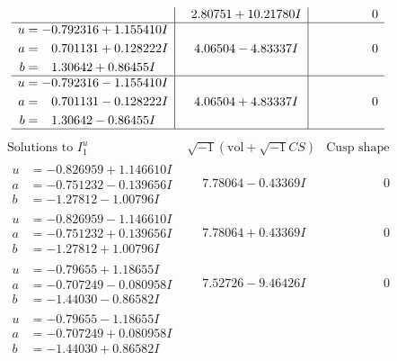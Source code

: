 \documentclass[1p]{elsarticle_modified}
\theoremstyle{definition}
\newcommand{\I}{\sqrt{-1}}
\begin{document}
$$\begin{array}{c|c|c}
 & \phantom{-}2.80751 + 10.21780 I & \phantom{-0.000000 } 0 \\ \hline\begin{aligned}
u &= -0.792316 + 1.155410 I \\
a &= \phantom{-}0.701131 + 0.128222 I \\
b &= \phantom{-}1.30642 + 0.86455 I\end{aligned}
 & \phantom{-}4.06504 - 4.83337 I & \phantom{-0.000000 } 0 \\ \hline\begin{aligned}
u &= -0.792316 - 1.155410 I \\
a &= \phantom{-}0.701131 - 0.128222 I \\
b &= \phantom{-}1.30642 - 0.86455 I\end{aligned}
 & \phantom{-}4.06504 + 4.83337 I & \phantom{-0.000000 } 0\\
 \hline 
 \end{array}$$\newpage$$\begin{array}{c|c|c}  
\text{Solutions to }I^u_{1}& \I (\text{vol} + \sqrt{-1}CS) & \text{Cusp shape}\\
 \hline 
\begin{aligned}
u &= -0.826959 + 1.146610 I \\
a &= -0.751232 - 0.139656 I \\
b &= -1.27812 - 1.00796 I\end{aligned}
 & \phantom{-}7.78064 - 0.43369 I & \phantom{-0.000000 } 0 \\ \hline\begin{aligned}
u &= -0.826959 - 1.146610 I \\
a &= -0.751232 + 0.139656 I \\
b &= -1.27812 + 1.00796 I\end{aligned}
 & \phantom{-}7.78064 + 0.43369 I & \phantom{-0.000000 } 0 \\ \hline\begin{aligned}
u &= -0.79655 + 1.18655 I \\
a &= -0.707249 - 0.080958 I \\
b &= -1.44030 - 0.86582 I\end{aligned}
 & \phantom{-}7.52726 - 9.46426 I & \phantom{-0.000000 } 0 \\ \hline\begin{aligned}
u &= -0.79655 - 1.18655 I \\
a &= -0.707249 + 0.080958 I \\
b &= -1.44030 + 0.86582 I\end{aligned}

\end{array}$$
\end{document}
